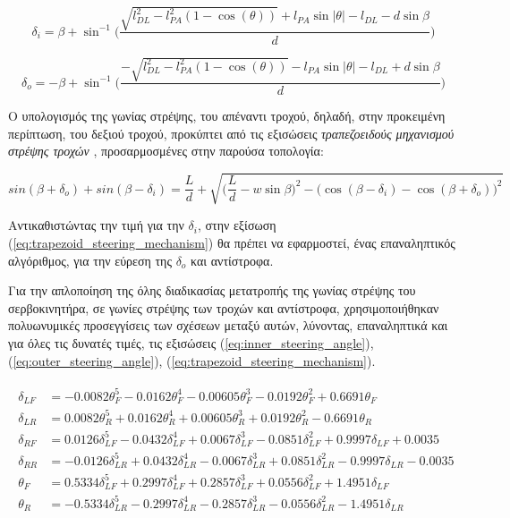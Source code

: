 \begin{equation}
	\label{eq:inner_steering_angle}
	\delta_i = \beta + \sin^{-1}{ \Bigg(
		\frac{
		\sqrt{l_{DL}^2 - l_{PA}^2(1-\cos(\theta))} + l_{PA} \sin{|\theta|} - l_{DL} - d \sin{\beta}}{d}} \Bigg)
\end{equation}

\begin{equation}
	\label{eq:outer_steering_angle}
	\delta_o = -\beta + \sin^{-1}{ \Bigg(
		\frac{
		-\sqrt{l_{DL}^2 - l_{PA}^2(1-\cos(\theta))} - l_{PA} \sin{|\theta|} - l_{DL} + d \sin{\beta}}{d}} \Bigg)
\end{equation}

\bigskip
Ο υπολογισμός της γωνίας στρέψης, του απέναντι τροχού, δηλαδή, στην προκειμένη περίπτωση, του δεξιού τροχού, προκύπτει από τις εξισώσεις \textit{τραπεζοειδούς μηχανισμού στρέψης τροχών} \cite{vehicle_dynamics}, προσαρμοσμένες στην παρούσα τοπολογία:

\begin{equation}
	\label{eq:trapezoid_steering_mechanism}
	sin(\beta + \delta_o) + sin(\beta - \delta_i) = \frac{L}{d} + \sqrt{\big(\frac{L}{d} - w \sin{\beta} \big)^2 - \big(\cos{(\beta-\delta_i)} - \cos{(\beta+\delta_o)}\big)^2}
\end{equation}

\bigskip
Αντικαθιστώντας την τιμή για την $\delta_i$, στην εξίσωση (\ref{eq:trapezoid_steering_mechanism}) θα πρέπει να εφαρμοστεί, ένας επαναληπτικός αλγόριθμος, για την εύρεση της $\delta_o$ και αντίστροφα.

\bigskip
Για την απλοποίηση της όλης διαδικασίας μετατροπής της γωνίας στρέψης του σερβοκινητήρα, σε γωνίες στρέψης των τροχών και αντίστροφα, χρησιμοποιήθηκαν πολυωνυμικές προσεγγίσεις των σχέσεων μεταξύ αυτών, λύνοντας, επαναληπτικά και για όλες τις δυνατές τιμές, τις εξισώσεις (\ref{eq:inner_steering_angle}), (\ref{eq:outer_steering_angle}), (\ref{eq:trapezoid_steering_mechanism}).

\begin{align}
\begin{split}
	\delta_{LF} &= -0.0082 \theta_{F}^5 - 0.0162 \theta_{F}^4 - 0.00605 \theta_{F}^3 - 0.0192 \theta_{F}^2 + 0.6691 \theta_{F}\\
	\delta_{LR} &= 0.0082 \theta_{R}^5 + 0.0162 \theta_{R}^4 + 0.00605 \theta_{R}^3 + 0.0192 \theta_{R}^2 - 0.6691 \theta_{R}\\
	\delta_{RF} &= 0.0126 \delta_{LF}^5 - 0.0432 \delta_{LF}^4 + 0.0067 \delta_{LF}^3 - 0.0851 \delta_{LF}^2 + 0.9997 \delta_{LF} + 0.0035\\
	\delta_{RR} &= -0.0126 \delta_{LR}^5 + 0.0432 \delta_{LR}^4 - 0.0067 \delta_{LR}^3 + 0.0851 \delta_{LR}^2 - 0.9997 \delta_{LR} - 0.0035\\
	\theta_{F} &= 0.5334 \delta_{LF}^5 + 0.2997 \delta_{LF}^4 + 0.2857 \delta_{LF}^3 + 0.0556 \delta_{LF}^2 + 1.4951 \delta_{LF}\\
	\theta_{R} &= - 0.5334 \delta_{LR}^5 - 0.2997 \delta_{LR}^4 - 0.2857 \delta_{LR}^3 - 0.0556 \delta_{LR}^2 - 1.4951 \delta_{LR}\\
\end{split}
\end{align}

